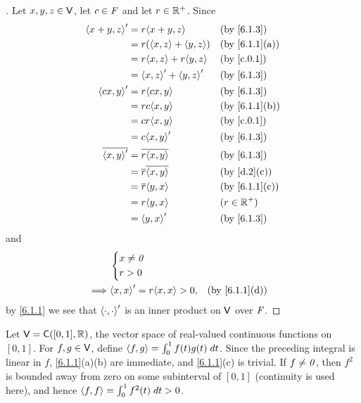 \begin{proof}[]
	Let \(x, y, z \in \mathsf{V}\), let \(c \in \mathit{F}\) and let \(r \in \mathbb{R}^+\).
	Since
	\begin{align*}
		\inn{x + y, z}'    & = r\inn{x + y, z}             &  & \by{6.1.3}    \\
		                   & = r (\inn{x, z} + \inn{y, z}) &  & \by{6.1.1}[a] \\
		                   & = r \inn{x, z} + r \inn{y, z} &  & \by{c.0.1}    \\
		                   & = \inn{x, z}' + \inn{y, z}'   &  & \by{6.1.3}    \\
		\inn{cx, y}'       & = r \inn{cx, y}               &  & \by{6.1.3}    \\
		                   & = rc \inn{x, y}               &  & \by{6.1.1}[b] \\
		                   & = cr \inn{x, y}               &  & \by{c.0.1}    \\
		                   & = c \inn{x, y}'               &  & \by{6.1.3}    \\
		\conj{\inn{x, y}'} & = \conj{r \inn{x, y}}         &  & \by{6.1.3}    \\
		                   & = \conj{r} \conj{\inn{x, y}}  &  & \by{d.2}[c]   \\
		                   & = \conj{r} \inn{y, x}         &  & \by{6.1.1}[c] \\
		                   & = r \inn{y, x}                &  & (r \in \R^+)  \\
		                   & = \inn{y, x}'                 &  & \by{6.1.3}
	\end{align*}
	and
	\begin{align*}
		         & \begin{dcases}
			           x \neq \zv \\
			           r > 0
		           \end{dcases}                                      \\
		\implies & \inn{x, x}' = r \inn{x, x} > 0, &  & \by{6.1.1}[d]
	\end{align*}
	by \cref{6.1.1} we see that \(\left\langle\cdot, \cdot\right\rangle'\) is an inner product on \(\mathsf{V}\) over \(\mathit{F}\).
\end{proof}

\begin{eg}\label{6.1.4}
	Let \(\V = \cfs([0, 1], \R)\), the vector space of real-valued continuous functions on \([0, 1]\).
	For \(f, g \in \mathsf{V}\), define \(\left\langle f, g\right\rangle = \int_0^1 f(t) g(t) \; dt\).
	Since the preceding integral is linear in \(f\), \cref{6.1.1}(a)(b) are immediate, and \cref{6.1.1}(c) is trivial.
	If \(f \neq \mathit{0}\), then \(f^2\) is bounded away from zero on some subinterval of \([0, 1]\) (continuity is used here), and hence \(\left\langle f, f\right\rangle = \int_0^1 f^2(t) \; dt > 0\).
\end{eg}


